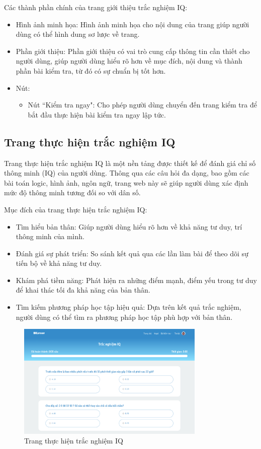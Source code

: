 Các thành phần chính của trang giới thiệu trắc nghiệm IQ:
\begin{itemize}
    \item Hình ảnh minh họa: Hình ảnh minh họa cho nội dung của trang giúp người dùng có thể hình dung sơ lược về trang.
    \item Phần giới thiệu: Phần giới thiệu có vai trò cung cấp thông tin cần thiết cho người dùng, giúp người dùng hiểu rõ hơn về mục đích, nội dung và thành phần bài kiểm tra, từ đó có sự chuẩn bị tốt hơn.
    \item Nút:
        \begin{itemize}
            \item Nút ``Kiểm tra ngay": Cho phép người dùng chuyển đến trang kiểm tra để bắt đầu thực hiện bài kiểm tra ngay lập tức.
        \end{itemize}
\end{itemize}


\subsection{Trang thực hiện trắc nghiệm IQ}
Trang thực hiện trắc nghiệm IQ là một nền tảng được thiết kế để đánh giá chỉ số thông minh (IQ) của người dùng. Thông qua các câu hỏi đa dạng, bao gồm các bài toán logic, hình ảnh, ngôn ngữ, trang web này sẽ giúp người dùng xác định mức độ thông minh tương đối so với dân số.

Mục đích của trang thực hiện trắc nghiệm IQ:
\begin{itemize}
    \item Tìm hiểu bản thân: Giúp người dùng hiểu rõ hơn về khả năng tư duy, trí thông minh của mình.
    \item Đánh giá sự phát triển: So sánh kết quả qua các lần làm bài để theo dõi sự tiến bộ về khả năng tư duy.
    \item Khám phá tiềm năng: Phát hiện ra những điểm mạnh, điểm yếu trong tư duy để khai thác tối đa khả năng của bản thân.
    \item Tìm kiếm phương pháp học tập hiệu quả: Dựa trên kết quả trắc nghiệm, người dùng có thể tìm ra phương pháp học tập phù hợp với bản thân.
\end{itemize}

\begin{figure}[H]
    \centering
    \includegraphics[width=0.8\textwidth]
    {images/chap5/iq.png}
    \vspace{0.5cm}
    \caption{Trang thực hiện trắc nghiệm IQ}
\end{figure}


